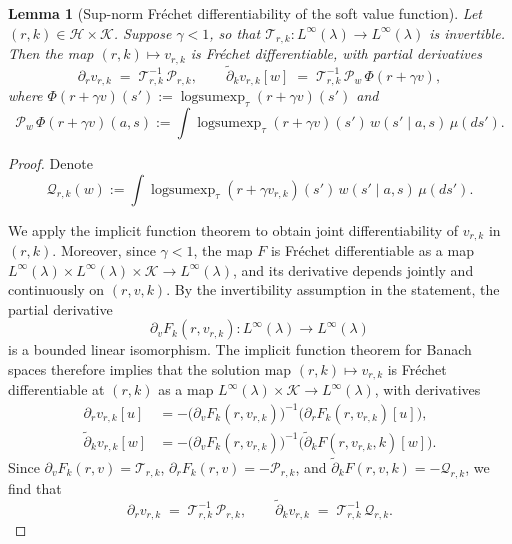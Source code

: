 \documentclass[11pt]{article}
\newcommand{\adk}{\widetilde{\partial}_k}
\theoremstyle{plain}
\newtheorem{lemma}[theorem]{Lemma}
\begin{document}
 
\begin{lemma}[Sup-norm Fréchet differentiability of the soft value function]
\label{lemma::IFT}
Let $(r,k) \in \mathcal{H} \times \mathcal{K}$. Suppose $\gamma < 1$, so that $\mathcal{T}_{r,k}: L^\infty(\lambda) \to L^\infty(\lambda)$ is invertible. Then the map \((r,k) \mapsto v_{r,k}\) is Fréchet differentiable, with partial derivatives
\[
\partial_r v_{r,k} \;=\; \mathcal T_{r,k}^{-1}\, \mathcal P_{r,k},
\qquad
\adk v_{r,k}[w] \;=\; \mathcal T_{r,k}^{-1}\, \mathcal{P}_{w}\,\Phi(r + \gamma v),
\]
where $\Phi(r + \gamma v)(s') := \operatorname{logsumexp}_{\tau}(r + \gamma v)(s')$ and
\[
\mathcal{P}_{w}\,\Phi(r + \gamma v)(a,s)
:= \int \operatorname{logsumexp}_{\tau}(r + \gamma v)(s')\, w(s'\mid a,s)\,\mu(ds').
\]
\end{lemma}
\begin{proof}
Denote
$$\mathcal Q_{r,k}(w):= \int \operatorname{logsumexp}_{\tau}(r + \gamma v_{r,k})(s')\, w(s'\mid a,s)\,\mu(ds').$$

We apply the implicit function theorem to obtain joint differentiability of $v_{r,k}$ in $(r,k)$.  
Moreover, since $\gamma <  1$, the map $F$ is Fr\'echet differentiable as a map 
$L^\infty(\lambda)\times L^\infty(\lambda)\times \mathcal K \to L^\infty(\lambda)$, and its derivative depends jointly and continuously on $(r,v,k)$. By the invertibility assumption in the statement, the partial derivative
\[
\partial_v F_{k}(r,v_{r,k}): L^\infty(\lambda) \to L^\infty(\lambda)
\]
is a bounded linear isomorphism.  
The implicit function theorem for Banach spaces therefore implies that the solution map 
\((r,k) \mapsto v_{r,k}\) is Fr\'echet differentiable at \((r,k)\) as a map 
\(L^\infty(\lambda)\times \mathcal K \to L^\infty(\lambda)\), with derivatives
\begin{align*}
    \partial_r v_{r,k}[u]  
&= -\big(\partial_v F_{k}(r,v_{r,k})\big)^{-1}\!\big(\partial_r F_{k}(r,v_{r,k})[u]\big),\\
\adk v_{r,k}[w]  
&= -\big(\partial_v F_{k}(r,v_{r,k})\big)^{-1}\!\big(\adk F(r,v_{r,k},k)[w]\big).
\end{align*}
Since $\partial_v F_{k}(r,v)=\mathcal T_{r,k}$, 
$\partial_r F_{k}(r,v)=-\mathcal P_{r,k}$, and 
$\adk F(r,v,k)=-\mathcal Q_{r,k}$,
 we find that
 \[
\partial_r v_{r,k} \;=\; \mathcal T_{r,k}^{-1}\, \mathcal P_{r,k},
\qquad
\adk v_{r,k} \;=\; \mathcal T_{r,k}^{-1}\, \mathcal Q_{r,k}.
\]


 
 

 
\end{proof}
\end{document}
